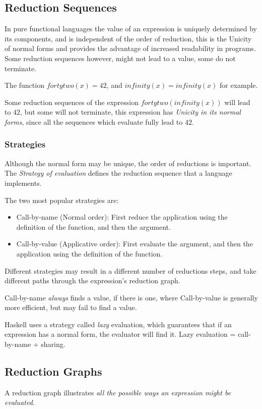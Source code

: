 \subsection{Reduction Sequences}
In pure functional languages the value of an expression is uniquely determined by its
components, and is independent of the order of reduction, this is the Unicity of normal
forms and provides the advantage of increased readability in programs. Some reduction
sequences however, might not lead to a value, some do not terminate.

The function $fortytwo(x) = 42$, and $infinity(x)=infinity(x)$ for example.

Some reduction sequences of the expression $fortytwo(infinity(x))$ will lead to $42$, but
some will not terminate, this expression has \textit{Unicity in its normal forms}, since
all the sequences which evaluate fully lead to $42$.

\subsubsection{Strategies}
Although the normal form may be unique, the order of reductions is important. The
\textit{Strategy of evaluation} defines the reduction sequence that a language implements.

The two most popular strategies are:
\begin{itemize}
	\item Call-by-name (Normal order): First reduce the application using the definition of the function, and then the argument.
	\item Call-by-value (Applicative order): First evaluate the argument, and then the application using the definition of the function.
\end{itemize}

Different strategies may result in a different number of reductions steps, and take different
paths through the expression's reduction graph.

Call-by-name \textit{always} finds a value, if there is one, where Call-by-value is generally
more efficient, but may fail to find a value.

Haskell uses a strategy called \textit{lazy} evaluation, which guarantees that if an 
expression has a normal form, the evaluator will find it. Lazy evaluation = call-by-name + sharing.

\subsection{Reduction Graphs}
A reduction graph illustrates \textit{all the possible ways an expression might be evaluated}.

